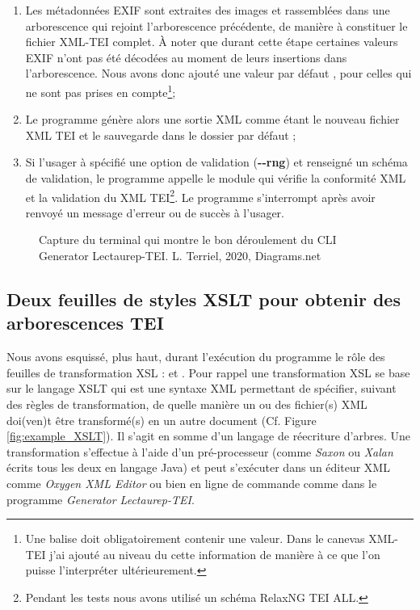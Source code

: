 \begin{enumerate}
    \item Les métadonnées EXIF sont extraites des images et rassemblées dans une arborescence  qui rejoint l'arborescence précédente, de manière à constituer le fichier XML-TEI complet. À noter que durant cette étape certaines valeurs EXIF n'ont pas été décodées au moment de leurs insertions dans l'arborescence. Nous avons donc ajouté une valeur par défaut , pour celles qui ne sont pas prises en compte\footnote{Une balise  doit obligatoirement contenir une valeur. Dans le canevas XML-TEI j'ai ajouté au niveau du  cette information de manière à ce que l'on puisse l'interpréter ultérieurement.};
    \item Le programme génère alors une sortie XML comme étant le nouveau fichier XML TEI et le sauvegarde dans le dossier par défaut 
    ;
    \item Si l'usager à spécifié une option de validation (\textbf{-{}-rng}) et renseigné un schéma de validation, le programme appelle le module  qui vérifie la conformité XML et la validation du XML TEI\footnote{Pendant les tests nous avons utilisé un schéma RelaxNG TEI ALL.}. Le programme s'interrompt après avoir renvoyé un message d'erreur ou de succès à l'usager.
\end{enumerate}

\begin{figure}[h]
    \centering
    \centerline{}
    \caption{Capture du terminal qui montre le bon déroulement du CLI Generator Lectaurep-TEI.   \textcopyright L. Terriel, 2020, Diagrams.net}
    \label{fig:prompt-lec-tei}
\end{figure}

\subsection{Deux feuilles de styles XSLT pour obtenir des arborescences TEI}

Nous avons esquissé, plus haut, durant l'exécution du programme le rôle des feuilles de transformation XSL :  et . Pour rappel une transformation XSL se base sur le langage XSLT qui est une syntaxe XML permettant de spécifier, suivant des règles de transformation, de quelle manière un ou des fichier(s) XML doi(ven)t être transformé(s) en un autre document (Cf. Figure \ref{fig:example_XSLT}). Il s'agit en somme d'un langage de réecriture d'arbres. Une transformation s'effectue à l'aide d'un pré-processeur (comme \textit{Saxon} ou \textit{Xalan} écrits tous les deux en langage Java) et peut s'exécuter dans un éditeur XML comme \textit{Oxygen XML Editor} ou bien en ligne de commande comme dans le programme \textit{Generator Lectaurep-TEI}.\\

